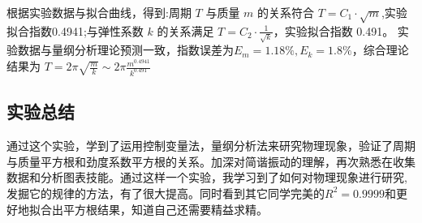 \documentclass[a4paper,zihao=5,UTF8,fontset=fandol]{../phyreport}
\begin{document}
根据实验数据与拟合曲线，得到:周期 \(T\) 与质量 \(m\) 的关系符合 \(T = C_1 \cdot \sqrt{m}\),实验拟合指数0.4941;与弹性系数 \(k\) 的关系满足 \(T = C_2 \cdot \frac{1}{\sqrt{k}}\)，实验拟合指数 0.491。
实验数据与量纲分析理论预测一致，指数误差为$E_m=1.18\%,E_k=1.8\%$，综合理论结果为 $T=2\pi\sqrt{\frac{m}{k}}\sim 2\pi\frac{m^{0.4941}}{k^{0.491}}$

\subsection{实验总结}

通过这个实验，学到了运用控制变量法，量纲分析法来研究物理现象，验证了周期与质量平方根和劲度系数平方根的关系。加深对简谐振动的理解，再次熟悉在收集数据和分析图表技能。通过这样一个实验，我学习到了如何对物理现象进行研究,发掘它的规律的方法，有了很大提高。同时看到其它同学完美的$R^2=0.9999$和更好地拟合出平方根结果，知道自己还需要精益求精。

\endBox
\end{document}
